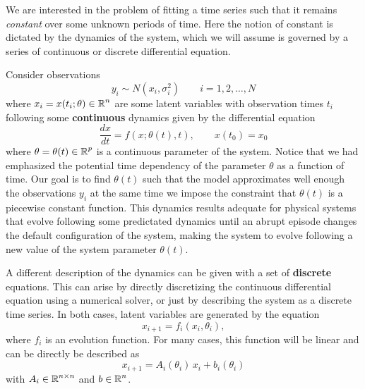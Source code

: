 We are interested in the problem of fitting a time series such that it remains \textit{constant} over some unknown periods of time. 
Here the notion of constant is dictated by the dynamics of the system, which we will assume is governed by a series of continuous or discrete differential equation. 

Consider observations
\begin{equation}
    y_i \sim N(x_i, \sigma_i^2) \qquad i=1,2,\ldots, N
\end{equation}
where $x_i = x(t_i; \theta) \in \operatorname{\mathbb{R}}^n$ are some latent variables with observation times $t_i$ following some \textbf{continuous} dynamics given by the differential equation
\begin{equation}
    \frac{dx}{dt}
    = 
    f(x; \theta(t), t),
    \qquad 
    x(t_0) = x_0
    \label{eq:ode}
\end{equation}
where $\theta = \theta(t) \in \operatorname{\mathbb{R}}^p$ is a continuous parameter of the system. 
Notice that we had emphasized the potential time dependency of the parameter $\theta$ as a function of time. 
Our goal is to find $\theta(t)$ such that the model approximates well enough the observations $y_i$ at the same time we impose the constraint that $\theta(t)$ is a piecewise constant function. 
This dynamics results adequate for physical systems that evolve following some predictated dynamics until an abrupt episode changes the default configuration of the system, making the system to evolve following a new value of the system parameter $\theta(t)$. 

A different description of the dynamics can be given with a set of \textbf{discrete} equations. 
This can arise by directly discretizing the continuous differential equation using a numerical solver, or just by describing the system as a discrete time series. 
In both cases, latent variables are generated by the equation 
\begin{equation}
    x_{i+1} = f_i(x_i, \theta_i),
\end{equation}
where $f_i$ is an evolution function. 
For many cases, this function will be linear and can be directly be described as 
\begin{equation}
    x_{i+1} = A_i(\theta_i) \, x_i + b_i(\theta_i)
    \label{eq:}
\end{equation}
with $A_i \in \operatorname{\mathbb{R}}^{n \times n}$ and $b \in \operatorname{\mathbb{R}}^n$.

